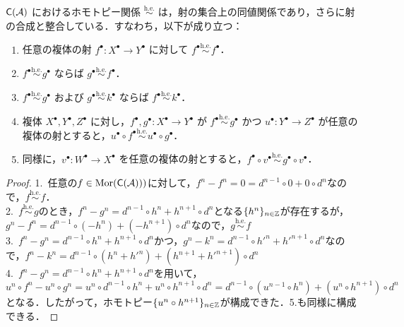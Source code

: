 \begin{lemm}\cite[p.300]{KS06}\label{lem:well_defined_composition}
$\mathsf{C}({\mathcal A})$ におけるホモトピー関係 $\overset{\mathrm{h.e.}}{\sim}$ は，射の集合上の同値関係であり，さらに射の合成と整合している．すなわち，以下が成り立つ：
\begin{enumerate}
  \item 任意の複体の射 $f^\bullet: X^\bullet \to Y^\bullet$ に対して $f^\bullet \overset{\mathrm{h.e.}}{\sim} f^\bullet$．
  \item $f^\bullet \overset{\mathrm{h.e.}}{\sim} g^\bullet$ ならば $g^\bullet \overset{\mathrm{h.e.}}{\sim} f^\bullet$．
  \item $f^\bullet \overset{\mathrm{h.e.}}{\sim} g^\bullet$ および $g^\bullet \overset{\mathrm{h.e.}}{\sim} k^\bullet$ ならば $f^\bullet \overset{\mathrm{h.e.}}{\sim} k^\bullet$．
  \item 複体 $X^\bullet, Y^\bullet, Z^\bullet$ に対し，$f^\bullet, g^\bullet: X^\bullet \to Y^\bullet$ が $f^\bullet \overset{\mathrm{h.e.}}{\sim} g^\bullet$ かつ $u^\bullet: Y^\bullet \to Z^\bullet$ が任意の複体の射とすると，$u^\bullet \circ f^\bullet \overset{\mathrm{h.e.}}{\sim} u^\bullet \circ g^\bullet$．
  \item 同様に，$v^\bullet: W^\bullet \to X^\bullet$ を任意の複体の射とすると，$f^\bullet \circ v^\bullet \overset{\mathrm{h.e.}}{\sim} g^\bullet \circ v^\bullet$．
\end{enumerate}
\end{lemm}

\begin{proof}
	1.\ 任意の$f\in\operatorname{\mathrm{Mor}}(\mathsf{C}({\mathcal A})))$に対して，$f^n -f^n  = 0 = d^{n-1}\circ 0 + 0\circ d^n$なので，$f\overset{\mathrm{h.e.}}{\sim}f$．\\
	2.\ $f \overset{\mathrm{h.e.}}{\sim}g$のとき，$f^n -g^n  = d^{n-1}\circ h^{n} + h^{n+1}\circ d^n$となる$\{h^n\}_{n\in{\mathbb Z}}$が存在するが，$g^n -f^n  = d^{n-1}\circ (-h^{n}) + (-h^{n+1})\circ d^n$なので，$g \overset{\mathrm{h.e.}}{\sim}f$\\
	3.\ $f^n -g^n  = d^{n-1}\circ h^{n} + h^{n+1}\circ d^n$かつ，$g^n -k^n  = d^{n-1}\circ h'^{n} + h'^{n+1}\circ d^n$なので，$f^n - k^n =d^{n-1}\circ (h^{n} + h'^n ) + (h^{n+1} + h'^{n+1})\circ d^n $\\
	4.\ $f^n -g^n  = d^{n-1}\circ h^{n} + h^{n+1}\circ d^n$を用いて，$u^n\circ f^n -u^n\circ g^n  = u^n\circ d^{n-1}\circ h^{n} + u^n\circ h^{n+1}\circ d^n = d^{n-1}\circ (u^{n-1}\circ h^n) + (u^n\circ h^{n+1})\circ d^n$となる．したがって，ホモトピー$\{u^n\circ h^{n+1}\}_{n\in{\mathbb Z}} $が構成できた．5.も同様に構成できる．
\end{proof}

